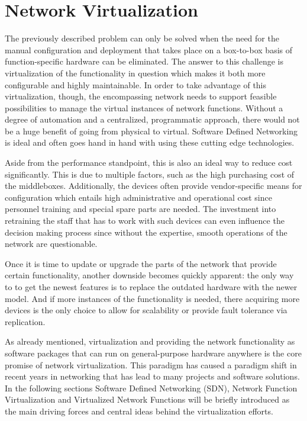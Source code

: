\section{Network Virtualization}
The previously described problem can only be solved when the need for the manual configuration and deployment that takes place on a box-to-box basis of function-specific hardware can be eliminated. The answer to this challenge is virtualization of the functionality in question which makes it both more configurable and highly maintainable. In order to take advantage of this virtualization, though, the encompassing network needs to support feasible possibilities to manage the virtual instances of network functions. Without a degree of automation and a centralized, programmatic approach, there would not be a huge benefit of going from physical to virtual. Software Defined Networking is ideal and often goes hand in hand with using these cutting edge technologies.

 Aside from the performance standpoint, this is also an ideal way to reduce cost significantly. This is due to multiple factors, such as the high purchasing cost of the middleboxes. Additionally, the devices often provide vendor-specific means for configuration which entails high administrative and operational cost since personnel training and special spare parts are needed.  The investment into retraining the staff that has to work with such devices can even influence the decision making process since without the expertise, smooth operations of the network are questionable. 

Once it is time to update or upgrade the parts of the network that provide certain functionality, another downside becomes quickly apparent: the only way to to get the newest features is to replace the outdated hardware with the newer model. And if more instances of the functionality is needed, there acquiring more devices is the only choice to allow for scalability or provide fault tolerance via replication. 

As already mentioned, virtualization and providing the network functionality as software packages that can run on general-purpose hardware anywhere is the core promise of network virtualization. This paradigm has caused a paradigm shift in recent years in networking that has lead to many projects and software solutions. In the following sections Software Defined Networking (SDN), Network Function Virtualization and Virtualized Network Functions will be briefly introduced as the main driving forces and central ideas behind the virtualization efforts. 



